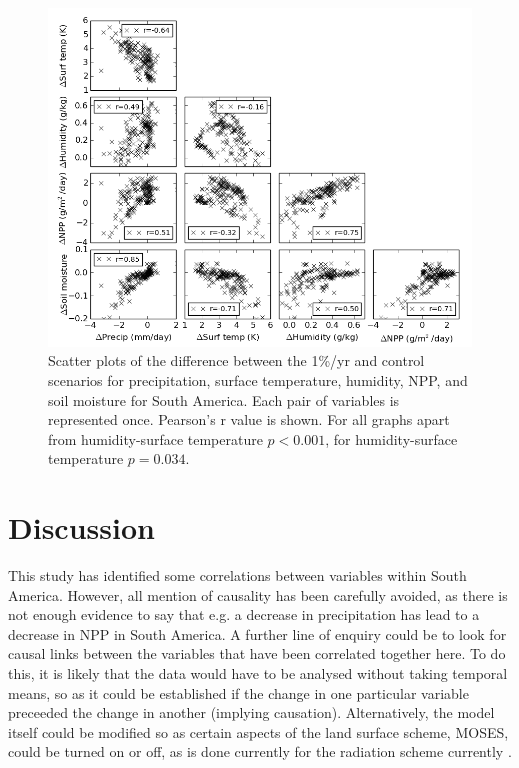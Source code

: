 \documentclass{article}
\begin{document}
\begin{figure}[hbp]
    \centering
    \includegraphics[width=\textwidth]{figures/corr}
    \caption{Scatter plots of the difference between the 1\%/yr and control scenarios for precipitation, surface temperature, humidity, NPP, and soil moisture for South America. Each pair of variables is represented once. Pearson's r value is shown. For all graphs apart from humidity-surface temperature $p < 0.001$, for humidity-surface temperature $p = 0.034$. }
    \label{fig:corr}
\end{figure}

\newpage

\section{Discussion}

This study has identified some correlations between variables within South America. However, all mention of causality has been carefully avoided, as there is not enough evidence to say that e.g. a decrease in precipitation has lead to a decrease in NPP in South America. A further line of enquiry could be to look for causal links between the variables that have been correlated together here. To do this, it is likely that the data would have to be analysed without taking temporal means, so as it could be established if the change in one particular variable preceeded the change in another (implying causation). Alternatively, the model itself could be modified so as certain aspects of the land surface scheme, MOSES, could be turned on or off, as is done currently for the radiation scheme currently \parencite{pope2000impact}.
\end{document}
